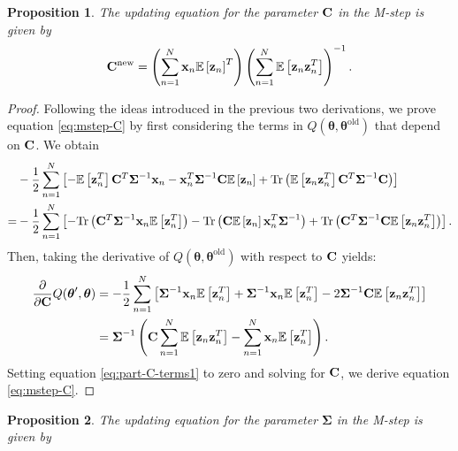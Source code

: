 \documentclass[12pt, oneside]{book}
\numberwithin{equation}{section}
\newcommand{\expectation}[1]{\mathbb{E}\left[#1\right]}
\newcommand{\Tr}[1]{\text{Tr}\left(#1\right)}
\newcommand{\x}{{\bf x}}
\newcommand{\z}{{\bf z}}
\newtheorem{proposition}{Proposition}[section]
\begin{document}
{%
\begin{proposition}
	The updating equation for the parameter ${\bf C}$ in the M-step is given by
	\begin{align}
		{\bf C}^{\text{\normalfont new}} &= \left(\sum_{n=1}^N \x_n \expectation{\z_n}^T \right)\left(\sum_{n=1}^N \expectation{\z_n \z_n^T} \right)^{-1}. \label{eq:mstep-C}\\
	\end{align}
\end{proposition}

\begin{proof}
	Following the ideas introduced in the previous two derivations, we prove equation \eqref{eq:mstep-C} by first considering the terms in $Q(\boldsymbol\theta, \boldsymbol\theta^\text{old})$ that depend on $\bf C$. We obtain
	\begin{align}
		& -\frac{1}{2}\sum_{n=1}^N \left[ -\expectation{\z_n^T} {\bf C}^T \boldsymbol{\Sigma}^{-1}\x_n - \x_n^T \boldsymbol{\Sigma}^{-1} {\bf C} \expectation{\z_n} + \text{Tr}\left(\expectation{\z_n\z_n^T}{\bf C}^T\boldsymbol\Sigma^{-1}{\bf C}\right)\right]\\
		=& -\frac{1}{2}\sum_{n=1}^N \left[ -\Tr{{\bf C}^T\boldsymbol{\Sigma}^{-1}\x_n \expectation{\z_n^T}} - \Tr{{\bf C}\expectation{\z_n}\x_n^T\boldsymbol{\Sigma}^{-1}} +  \Tr{{\bf C}^T\boldsymbol{\Sigma}^{-1}{\bf C}\expectation{\z_n\z_n^T}} \right].
	\end{align}
	Then, taking the derivative of $Q(\boldsymbol{\theta}, \boldsymbol{\theta}^{\text{old}})$ with respect to $\bf C$ yields:
	\begin{align}
		\frac{\partial}{\partial {\bf C}} Q(\boldsymbol{\theta}', \boldsymbol{\theta}) &= -\frac{1}{2}\sum_{n=1}^N \left[ \boldsymbol{\Sigma}^{-1} \x_n \expectation{\z_n^T} + \boldsymbol{\Sigma}^{-1}\x_n\expectation{\z_n^T} - 2 \boldsymbol{\Sigma}^{-1}{\bf C}\expectation{\z_n\z_n^T} \right] \\
		&= \boldsymbol{\Sigma}^{-1} \left( {\bf C} \sum_{n=1}^N \expectation{\z_n\z_n^T} - \sum_{n=1}^N\x_n\expectation{\z_n^T} \right). \label{eq:part-C-terms1}
	\end{align}
	Setting equation \eqref{eq:part-C-terms1} to zero and solving for $\bf C$, we derive equation \eqref{eq:mstep-C}.
\end{proof}

\begin{proposition}
	The updating equation for the parameter $\boldsymbol{\Sigma}$ in the M-step is given by
	

\end{proposition}}
\end{document}
